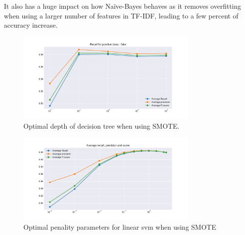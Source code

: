 It also has a huge impact on how Na\"{i}ve-Bayes behaves as it removes overfitting when using a larger number of features in TF-IDF, leading to a few percent of accuracy increase. \\
\begin{figure}
	\centering
	\includegraphics[width=0.8\textwidth]{images/chapitre3/fake-dt-SMOTE}
	\caption{Optimal depth of decision tree when using SMOTE.}
	\label{fig:chap3:dt3}
\end{figure}
\begin{figure}
	\centering
	\includegraphics[width=0.8\textwidth]{images/chapitre3/svc_fake_smote}
	\caption{Optimal penality parameters for linear svm when using SMOTE}
	\label{fig:chap3:lsvm3}
\end{figure}


